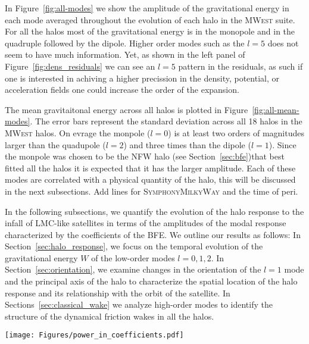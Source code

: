 \documentclass[twocolumn, linenumbers]{openjournal}
\newcommand{\mwest}{\textsc{MWest }}
\newcommand{\symphony}{\textsc{SymphonyMilkyWay }}
\begin{document}
In Figure~\ref{fig:all-modes} we show the amplitude of the gravitational energy 
in each mode averaged throughout the evolution of each halo in the \mwest suite. For all the halos 
most of the gravitational energy is in the monopole and in the quadruple followed 
by the dipole. Higher order modes such as the $l=5$ does not seem to have much 
information. Yet, as shown in the left panel of Figure~\ref{fig:dens_residuals} 
we can see an $l=5$ pattern in the residuals, as such if one is interested in 
achiving a higher precission in the density, potential, or acceleration fields 
one could increase the order of the expansion. 

The mean gravitaitonal energy across all halos is plotted in Figure~\ref{fig:all-mean-modes}.
The error bars represent the standard deviation across all 18 halos in the \mwest halos.
On evrage the monpole ($l=0$) is at least two orders of magnitudes larger than the 
quadupole ($l=2$) and three times than the dipole ($l=1$). Since the monpole was chosen to 
be the NFW halo (see Section~\ref{sec:bfe})that best fitted all the halos it is expected that it has the larger 
amplitude. Each of these modes are correlated with a physical quantity of the halo, 
this will be discussed in the next subsections. {\color{Coral3} Add lines for \symphony
and the time of peri}. 

In the following subsections, we quantify the evolution of the halo response to the infall 
of LMC-like satellites in terms of the amplitudes of the modal response characterized by the 
coefficients of the BFE. We outline our results as follows: In Section~\ref{sec:halo_response}, 
we focus on the temporal evolution of the gravitational energy $W$ of the low-order modes 
$l = 0, 1, 2$. In Section~\ref{sec:orientation}, we examine changes in the orientation of 
the $l = 1$ mode and the principal axis of the halo to characterize the spatial location 
of the halo response and its relationship with the orbit of the satellite. In 
Sections~\ref{sec:classical_wake} we analyze high-order modes 
to identify the structure of the dynamical friction wakes in all the halos.

\begin{figure*}[h]
    \centering
    \texttt{[image: Figures/power\_in\_coefficients.pdf]}
    \caption{\textit{Left:} Mean gravitational power through the evolution of each
     halo for the $l=0-5$ modes. The monopole ($l=0$) mode
     is the largerst in evevery halo and at every time during the evolution of the halo.
     On average, the quadrupole ($l=2$) and dipole ($l=2$) modes are the second and third
     most dominant modes.}
    \label{fig:all-modes}
\end{figure*}
\end{document}
